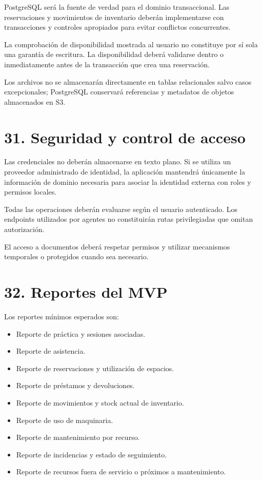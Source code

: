 \documentclass[12pt]{article}
\begin{document}
PostgreSQL será la fuente de verdad para el dominio transaccional. Las reservaciones y movimientos de inventario deberán implementarse con transacciones y controles apropiados para evitar conflictos concurrentes.

La comprobación de disponibilidad mostrada al usuario no constituye por sí sola una garantía de escritura. La disponibilidad deberá validarse dentro o inmediatamente antes de la transacción que crea una reservación.

Los archivos no se almacenarán directamente en tablas relacionales salvo casos excepcionales; PostgreSQL conservará referencias y metadatos de objetos almacenados en S3.

\section*{31. Seguridad y control de acceso}

Las credenciales no deberán almacenarse en texto plano. Si se utiliza un proveedor administrado de identidad, la aplicación mantendrá únicamente la información de dominio necesaria para asociar la identidad externa con roles y permisos locales.

Todas las operaciones deberán evaluarse según el usuario autenticado. Los endpoints utilizados por agentes no constituirán rutas privilegiadas que omitan autorización.

El acceso a documentos deberá respetar permisos y utilizar mecanismos temporales o protegidos cuando sea necesario.

\section*{32. Reportes del MVP}

Los reportes mínimos esperados son:

\begin{itemize}[leftmargin=1.2cm]
    \item Reporte de práctica y sesiones asociadas.
    \item Reporte de asistencia.
    \item Reporte de reservaciones y utilización de espacios.
    \item Reporte de préstamos y devoluciones.
    \item Reporte de movimientos y stock actual de inventario.
    \item Reporte de uso de maquinaria.
    \item Reporte de mantenimiento por recurso.
    \item Reporte de incidencias y estado de seguimiento.
    \item Reporte de recursos fuera de servicio o próximos a mantenimiento.
\end{itemize}
\end{document}
